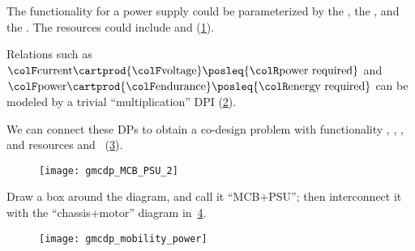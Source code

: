 \begin{example}

    The functionality for a power supply could be parameterized by the , the , and the .
    The resources could include  and  (\cref{fig:example-ba}).

    \begin{figure}[h!]
        \centering
        \caption{}
        \label{fig:example-ba}
    \end{figure}


    Relations such as ${\colF\mbox{current}}\cartprod{\colF\mbox{voltage}}\posleq{\colR\mbox{power required}}$ and ${\colF\mbox{power}}\cartprod{\colF\mbox{endurance}}\posleq{\colR\mbox{energy required}}$ can be modeled by a trivial ``multiplication'' DPI (\cref{fig:current_times_voltage}).

    \begin{figure}[h!]
        \centering
        \caption{}
        \label{fig:current_times_voltage}
    \end{figure}


    We can connect these DPs to obtain a co-design problem with functionality , , , and resources  and ~(\cref{fig:connect}).

    \begin{figure}[h!]
        \centering
        \texttt{[image: gmcdp\_MCB\_PSU\_2]}
        \caption{}
        \label{fig:connect}
    \end{figure}


    Draw a box around the diagram, and call it ``MCB+PSU''; then interconnect it with the ``chassis+motor'' diagram in~\cref{fig:another}.

    \begin{figure}[h!]
        \centering
        \texttt{[image: gmcdp\_mobility\_power]}
        \caption{}
        \label{fig:another}
    \end{figure}


\end{example}
